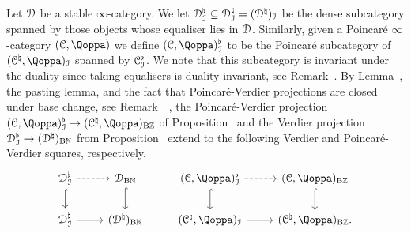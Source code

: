 \begin{construction}
\label{construction:PV-square}%
Let $\mathcal{D}$ be a stable $\infty$-category. We let $\mathcal{D}^{\flat}_{\mathcal{I}} \subseteq \mathcal{D}_{\mathcal{I}}^\natural = (\mathcal{D}^{\natural})_{\mathcal{I}}$ be the dense subcategory spanned by those objects whose equaliser lies in $\mathcal{D}$. Similarly, given a Poincaré $\infty$-category 
$(\C,\QF)$ we define $(\C,\QF)^{\flat}_\I$ to be 
the Poincaré subcategory of $(\C^\natural,\QF)_\I$ spanned by $\mathcal C^{\flat}_{\mathcal{I}}$. We note that this subcategory is invariant under the duality since taking equalisers is duality invariant, see Remark~.
By Lemma~, the pasting lemma, and the fact that Poincaré-Verdier projections are closed under base change, see Remark~~, 
the Poincaré-Verdier projection $(\C,\QF)^{\flat}_{\I} \to (\C^\natural,\QF)_{\B\ZZ}$ of Proposition~ and the Verdier projection $\mathcal{D}^{\flat}_{\mathcal{I}} \to (\mathcal{D}^{\natural})_{\mathrm{B}\mathbb{N}}$ from Proposition~\; extend to the following Verdier and Poincaré-Verdier squares, respectively.
\[
\begin{tikzcd}
\D^{\flat}_\I \ar[r, dashed]  \ar[d, hook] &  \D_{\B\NN}\ar[d,hook] & (\C,\QF)^{\flat}_\I \ar[r, dashed]  \ar[d, hook] & (\C,\QF)_{\B\ZZ} \ar[d,hook] \\
\D^\natural_\I \ar[r] & (\D^\natural)_{\B\NN} &  (\C^\natural,\QF)_\I \ar[r] & (\C^\natural,\QF)_{\B\ZZ}. 
\end{tikzcd}
\]
\end{construction}







